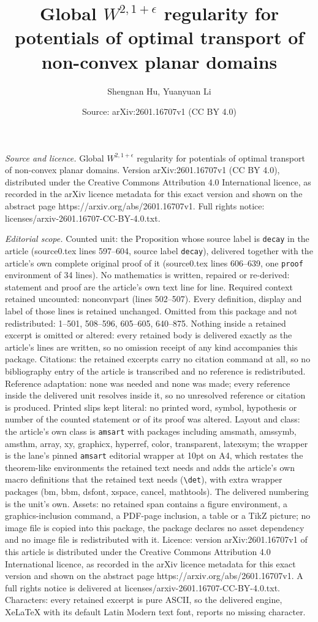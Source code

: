 \documentclass[10pt,a4paper]{amsart}
\title[Global $W^{2,1+\epsilon}$ regularity for potentials of optim]{Global $W^{2,1+\epsilon}$ regularity for potentials of optimal transport of non-convex planar domains}
\author{Shengnan Hu, Yuanyuan Li}
\date{Source: arXiv:2601.16707v1 (CC BY 4.0)}
\begin{document}
\maketitle

\noindent\emph{Source and licence.} Global $W^{2,1+\epsilon}$ regularity for potentials of optimal transport of non-convex planar domains. Version arXiv:2601.16707v1 (CC BY 4.0), distributed under the Creative Commons Attribution 4.0 International licence, as recorded in the arXiv licence metadata for this exact version and shown on the abstract page https://arxiv.org/abs/2601.16707v1. Full rights notice: licenses/arxiv-2601.16707-CC-BY-4.0.txt.\par\smallskip

\noindent\textit{Editorial scope.} Counted unit: the Proposition whose source label is \texttt{decay} in the article (source0.tex lines 597--604, source label \texttt{decay}), delivered together with the article's own complete original proof of it (source0.tex lines 606--639, one \texttt{proof} environment of 34 lines). No mathematics is written, repaired or re-derived: statement and proof are the article's own text line for line. Required context retained uncounted: nonconvpart (lines 502--507). Every definition, display and label of those lines is retained unchanged. Omitted from this package and not redistributed: 1--501, 508--596, 605--605, 640--875. Nothing inside a retained excerpt is omitted or altered: every retained body is delivered exactly as the article's lines are written, so no omission receipt of any kind accompanies this package. Citations: the retained excerpts carry no citation command at all, so no bibliography entry of the article is transcribed and no reference is redistributed. Reference adaptation: none was needed and none was made; every reference inside the delivered unit resolves inside it, so no unresolved reference or citation is produced. Printed slips kept literal: no printed word, symbol, hypothesis or number of the counted statement or of its proof was altered. Layout and class: the article's own class is \texttt{amsart} with packages including amsmath, amssymb, amsthm, array, xy, graphicx, hyperref, color, transparent, latexsym; the wrapper is the lane's pinned \texttt{amsart} editorial wrapper at 10pt on A4, which restates the theorem-like environments the retained text needs and adds the article's own macro definitions that the retained text needs (\texttt{\textbackslash det}), with extra wrapper packages (bm, bbm, dsfont, xspace, cancel, mathtools). The delivered numbering is the unit's own. Assets: no retained span contains a figure environment, a graphics-inclusion command, a PDF-page inclusion, a table or a TikZ picture; no image file is copied into this package, the package declares no asset dependency and no image file is redistributed with it. Licence: version arXiv:2601.16707v1 of this article is distributed under the Creative Commons Attribution 4.0 International licence, as recorded in the arXiv licence metadata for this exact version and shown on the abstract page https://arxiv.org/abs/2601.16707v1. A full rights notice is delivered at licenses/arxiv-2601.16707-CC-BY-4.0.txt. Characters: every retained excerpt is pure ASCII, so the delivered engine, XeLaTeX with its default Latin Modern text font, reports no missing character.
\end{document}
